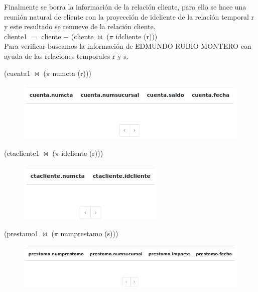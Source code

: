\documentclass{exam}
\begin{document}
\begin{questions}
\begin{enumerate}[label=\alph*.]
		Finalmente se borra la información de la relación cliente, para ello se hace una reunión natural de cliente con la proyección de idcliente de la relación temporal r y este resultado se remueve de la relación cliente.\\
		
		cliente1 $=$ cliente $-$ (cliente $\bowtie$ ($\pi$ idcliente (r)))\\

		Para verificar buscamos la información de EDMUNDO RUBIO MONTERO con ayuda de las relaciones temporales r y s.
		
		(cuenta1 $\bowtie$ ($\pi$ numcta (r)))
		\begin{center}
		\begin{figure}[h!]
			\includegraphics[width=12cm]{imgs/a2.png}
			\centering
		\end{figure}	
		\end{center}
		
		(ctacliente1 $\bowtie$ ($\pi$ idcliente (r)))
		\begin{center}
		\begin{figure}[h!]
			\includegraphics[width=7cm]{imgs/a3.png}
			\centering
		\end{figure}	
		\end{center}
		
		(prestamo1 $\bowtie$ ($\pi$ numprestamo (s)))
		\begin{center}
		\begin{figure}[h!]
			\includegraphics[width=14cm]{imgs/a4.png}
			\centering
		\end{figure}	
		\end{center}
		

\end{enumerate}
\end{questions}
\end{document}
